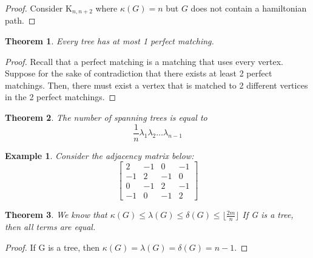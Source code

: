 \documentclass[12pt,reqno]{amsart}
\theoremstyle{plain}
\newtheorem*{theorem}{Theorem}
\newtheorem*{example}{Example}
\begin{document}
    \begin{proof}
        Consider K$_{n,n+2}$ where $\kappa(G) = n$ but $G$ does not contain a hamiltonian path.
    \end{proof}

    \begin{theorem}
        Every tree has at most 1 perfect matching.
    \end{theorem}

    \begin{proof}
        Recall that a perfect matching is a matching that uses every vertex.
        Suppose for the sake of contradiction that there exists at least 2 perfect matchings.
        Then, there must exist a vertex that is matched to 2 different vertices in the 2 perfect matchings.
    \end{proof}

    \begin{theorem}
        The number of spanning trees is equal to 
        \[ \frac1n \lambda_1 \lambda_2 \dots \lambda_{n-1}\]
    \end{theorem}

    \begin{example}
        Consider the adjacency matrix below:
        \[\begin{bmatrix}
            2 & -1 & 0 & -1 \\
            -1 & 2 & -1 & 0 \\
            0 & -1 & 2 & -1 \\
            -1 & 0 & -1 & 2
        \end{bmatrix} \]
    \end{example}

    \begin{theorem}
        We know that $\kappa(G) \le \lambda(G) \le \delta(G) \le \lfloor{\frac{2m}{n}}\rfloor$
        If G is a tree, then all terms are equal.
    \end{theorem}

    \begin{proof}
        If G is a tree, then $\kappa(G) = \lambda(G) = \delta(G) = n - 1$.
    \end{proof}
\end{document}
